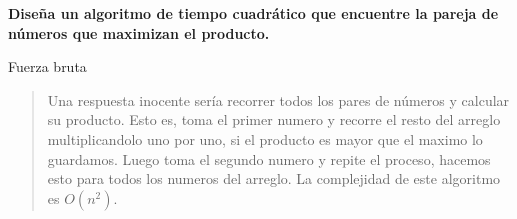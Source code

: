 \textbf{Diseña un algoritmo de tiempo cuadrático que encuentre la pareja de números que maximizan el producto.}\vspace{.2cm}

\textcolor{bibi}{Fuerza bruta}
\begin{quote}
    Una respuesta inocente sería recorrer todos los pares de números y calcular su producto. Esto es, toma el primer numero y recorre el resto del arreglo multiplicandolo uno por uno, si el producto es mayor que el maximo lo guardamos. Luego toma el segundo numero y repite el proceso, hacemos esto para todos los numeros del arreglo. La complejidad de este algoritmo es $O(n^2)$. \vspace{.2cm}
\end{quote}